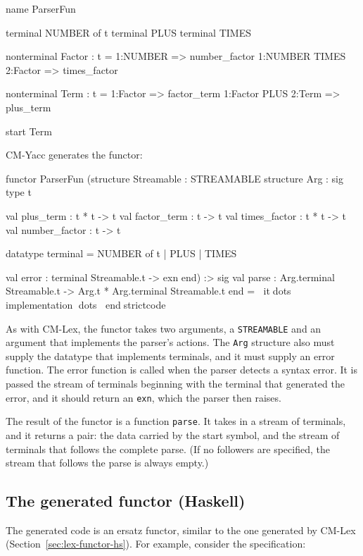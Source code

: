 \documentclass[10pt]{article}
\begin{document}
\begin{strictcode}
\begin{strictcode}
\begin{strictcode}
\begin{strictcode}
\begin{code}
name ParserFun

terminal NUMBER of t
terminal PLUS
terminal TIMES

nonterminal Factor : t =
  1:NUMBER => number_factor
  1:NUMBER TIMES 2:Factor => times_factor

nonterminal Term : t =
  1:Factor => factor_term
  1:Factor PLUS 2:Term => plus_term

start Term
\end{code}

CM-Yacc generates the functor:

\begin{strictcode}
functor ParserFun
   (structure Streamable : STREAMABLE
    structure Arg :
       sig
          type t

          val plus_term : t * t -> t
          val factor_term : t -> t
          val times_factor : t * t -> t
          val number_factor : t -> t

          datatype terminal =
             NUMBER of t
           | PLUS
           | TIMES

          val error : terminal Streamable.t -> exn
       end)
   :>
   sig
      val parse : Arg.terminal Streamable.t -> Arg.t * Arg.terminal Streamable.t
   end
= itdots implementation dots
endstrictcode

As with CM-Lex, the functor takes two arguments, a {\tt STREAMABLE}
and an argument that implements the parser's actions.  The {\tt Arg}
structure also must supply the datatype that implements terminals, and
it must supply an error function.  The error function is called when
the parser detects a syntax error.  It is passed the stream of
terminals beginning with the terminal that generated the error, and it
should return an {\tt exn}, which the parser then raises.

The result of the functor is a function {\tt parse}.  It takes in a
stream of terminals, and it returns a pair: the data carried by the
start symbol, and the stream of terminals that follows the complete
parse.  (If no followers are specified, the stream that follows the
parse is always empty.)


\subsection{The generated functor (Haskell)}

The generated code is an ersatz functor, similar to the one generated
by CM-Lex (Section~\ref{sec:lex-functor-hs}).  For example, consider
the specification:


\end{strictcode}
\end{strictcode}
\end{strictcode}
\end{strictcode}
\end{strictcode}
\end{document}
